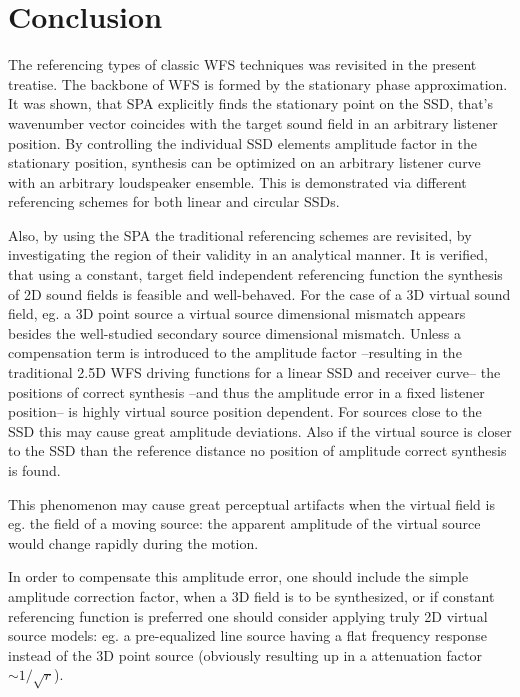 \documentclass[12pt,a4paper]{article}
\begin{document}
\section{Conclusion}

The referencing types of classic WFS techniques was revisited in the present treatise. The backbone of WFS is formed by the stationary phase approximation. It was shown, that SPA explicitly finds the stationary point on the SSD, that's wavenumber vector coincides with the target sound field in an arbitrary listener position. By controlling the individual SSD elements amplitude factor in the stationary position, synthesis can be optimized on an arbitrary listener curve with an arbitrary loudspeaker ensemble. This is demonstrated via different referencing schemes for both linear and circular SSDs.

Also, by using the SPA the traditional referencing schemes are revisited, by investigating the region of their validity in an analytical manner. It is verified, that using a constant, target field independent referencing function the synthesis of 2D sound fields is feasible and well-behaved. For the case of a 3D virtual sound field, eg. a 3D point source a virtual source dimensional mismatch appears besides the well-studied secondary source dimensional mismatch. Unless a compensation term is introduced to the amplitude factor --resulting in the traditional 2.5D WFS driving functions for a linear SSD and receiver curve-- the positions of correct synthesis --and thus the amplitude error in a fixed listener position-- is highly virtual source position dependent. For sources close to the SSD this may cause great amplitude deviations. Also if the virtual source is closer to the SSD than the reference distance no position of amplitude correct synthesis is found. 

This phenomenon may cause great perceptual artifacts when the virtual field is eg. the field of a moving source: the apparent amplitude of the virtual source would change rapidly during the motion.

In order to compensate this amplitude error, one should include the simple amplitude correction factor, when a 3D field is to be synthesized, or if constant referencing function is preferred one should consider applying truly 2D virtual source models: eg. a pre-equalized line source having a flat frequency response instead of the 3D point source (obviously resulting up in a attenuation factor $\sim 1/\sqrt{r}$). 



\end{document}
